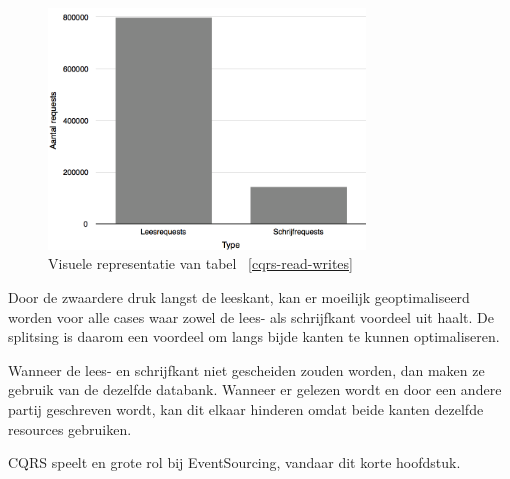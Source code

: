 \begin{figure}[h]
\caption{Visuele representatie van tabel ~\ref{cqrs-read-writes}}
\centering
\includegraphics[width=0.75\textwidth]{img/lees-en-schrijfkant}
\end{figure}

Door de zwaardere druk langst de leeskant, kan er moeilijk geoptimaliseerd worden voor alle cases waar zowel de lees- als schrijfkant voordeel uit haalt. De splitsing is daarom een voordeel om langs bijde kanten te kunnen optimaliseren.

Wanneer de lees- en schrijfkant niet gescheiden zouden worden, dan maken ze gebruik van de dezelfde databank. Wanneer er gelezen wordt en door een andere partij geschreven wordt, kan dit elkaar hinderen omdat beide kanten dezelfde resources gebruiken.

CQRS speelt en grote rol bij EventSourcing, vandaar dit korte hoofdstuk.
